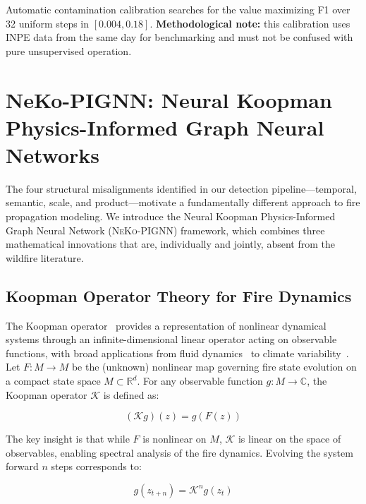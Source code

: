 \documentclass[11pt,twocolumn,a4paper]{article}
\newcommand{\abbrev}[1]{{\small\textsc{#1}}}
\newcommand{\R}{\mathbb{R}}
\newcommand{\C}{\mathbb{C}}
\newcommand{\sK}{\mathcal{K}}
\begin{document}
Automatic contamination calibration searches for the value maximizing F1 over 32 uniform steps in $[0.004, 0.18]$. \textbf{Methodological note:} this calibration uses \abbrev{INPE} data from the same day for benchmarking and must not be confused with pure unsupervised operation.

\section{NeKo-PIGNN: Neural Koopman Physics-Informed Graph Neural Networks}
\label{sec:neko}

The four structural misalignments identified in our detection pipeline---temporal, semantic, scale, and product---motivate a fundamentally different approach to fire propagation modeling. We introduce the Neural Koopman Physics-Informed Graph Neural Network (\abbrev{NeKo-PIGNN}) framework, which combines three mathematical innovations that are, individually and jointly, absent from the wildfire literature.

\subsection{Koopman Operator Theory for Fire Dynamics}

The Koopman operator~\cite{koopman1931} provides a representation of nonlinear dynamical systems through an infinite-dimensional linear operator acting on observable functions, with broad applications from fluid dynamics~\cite{mezic2013,rowley2009} to climate variability~\cite{lorenzo2026}. Let $F: M \to M$ be the (unknown) nonlinear map governing fire state evolution on a compact state space $M \subset \R^d$. For any observable function $g: M \to \C$, the Koopman operator $\sK$ is defined as:

\begin{equation}
(\sK g)(z) = g(F(z))
\label{eq:koopman_def}
\end{equation}

The key insight is that while $F$ is nonlinear on $M$, $\sK$ is linear on the space of observables, enabling spectral analysis of the fire dynamics. Evolving the system forward $n$ steps corresponds to:

\begin{equation}
g(z_{t+n}) = \sK^n g(z_t)
\label{eq:koopman_iter}
\end{equation}
\end{document}
